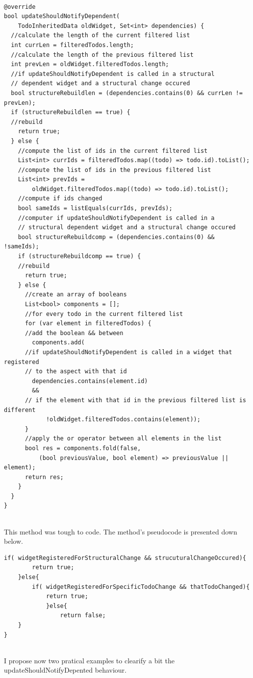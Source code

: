 \begin{code}
\mbox{}
\label{code:2.46}
\begin{verbatim}

@override
bool updateShouldNotifyDependent(
    TodoInheritedData oldWidget, Set<int> dependencies) {
  //calculate the length of the current filtered list  
  int currLen = filteredTodos.length;
  //calculate the length of the previous filtered list  
  int prevLen = oldWidget.filteredTodos.length;
  //if updateShouldNotifyDependent is called in a structural
  // dependent widget and a structural change occured
  bool structureRebuildlen = (dependencies.contains(0) && currLen != prevLen);
  if (structureRebuildlen == true) {
  //rebuild
    return true;
  } else {
    //compute the list of ids in the current filtered list
    List<int> currIds = filteredTodos.map((todo) => todo.id).toList();
    //compute the list of ids in the previous filtered list
    List<int> prevIds =
        oldWidget.filteredTodos.map((todo) => todo.id).toList();
    //compute if ids changed
    bool sameIds = listEquals(currIds, prevIds);
    //computer if updateShouldNotifyDependent is called in a 
    // structural dependent widget and a structural change occured
    bool structureRebuildcomp = (dependencies.contains(0) && !sameIds);
    if (structureRebuildcomp == true) {
    //rebuild
      return true;
    } else {
      //create an array of booleans
      List<bool> components = [];
      //for every todo in the current filtered list
      for (var element in filteredTodos) {
      //add the boolean && between
        components.add(
      //if updateShouldNotifyDependent is called in a widget that registered 
      // to the aspect with that id        
        dependencies.contains(element.id) 
        &&
      // if the element with that id in the previous filtered list is different
            !oldWidget.filteredTodos.contains(element));
      }
      //apply the or operator between all elements in the list
      bool res = components.fold(false,
          (bool previousValue, bool element) => previousValue || element);
      return res;
    }
  }
}
\end{verbatim}
\end{code}
\mbox{}\\
This method was tough to code. The method's pseudocode is presented down below. 
\mbox{}\\
\begin{code}
\mbox{}
\label{code:2.47}
\begin{verbatim}
if( widgetRegisteredForStructuralChange && strucuturalChangeOccured){
        return true;
    }else{
        if( widgetRegisteredForSpecificTodoChange && thatTodoChanged){
            return true;
            }else{
                return false;
    }
}
\end{verbatim}
\end{code}
\mbox{}\\
I propose now two pratical examples to clearify a bit the  updateShouldNotifyDepented behaviour.
